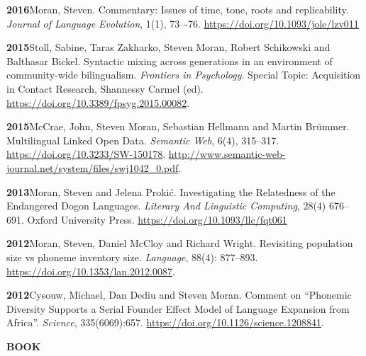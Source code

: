 \documentclass[11pt]{article}
\newcommand{\hangpara}{
 \setlength{\parindent}{0in} %
 \hangindent=0.42in %
}
\begin{document}
\hangpara
\vskip 6pt
{\bf 2016}\hspace{1ex}Moran, Steven. Commentary: Issues of time, tone, roots and replicability. \textit{Journal of Language Evolution}, 1(1), 73–-76. \url{https://doi.org/10.1093/jole/lzv011}

\vskip 6pt
\hangpara
{\bf 2015}\hspace{1ex}Stoll, Sabine, Taras Zakharko, Steven Moran, Robert Schikowski and Balthasar Bickel. Syntactic mixing across generations in an environment of community-wide bilingualism. \textit{Frontiers in Psychology}. Special Topic: Acquisition in Contact Research, Shannessy Carmel (ed). \url{https://doi.org/10.3389/fpsyg.2015.00082}. %

\hangpara
\vskip 6pt
{\bf 2015}\hspace{1ex}McCrae, John, Steven Moran, Sebastian Hellmann and Martin Brümmer. Multilingual Linked Open Data. \textit{Semantic Web}, 6(4), 315--317. \url{https://doi.org/10.3233/SW-150178}. \url{http://www.semantic-web-journal.net/system/files/swj1042\_0.pdf}.

\vskip 6pt
\hangpara
{\bf 2013}\hspace{1ex}Moran, Steven and Jelena Proki{\'c}. Investigating the Relatedness of the Endangered Dogon Languages. \textit{Literary And Linguistic Computing}, 28(4) 676--691. Oxford University Press. \url{https://doi.org/10.1093/llc/fqt061}

\vskip 6pt
\hangpara
{\bf 2012}\hspace{1ex}Moran, Steven, Daniel McCloy and Richard Wright. Revisiting population size vs phoneme inventory size. {\it Language}, 88(4): 877--893. \url{https://doi.org/10.1353/lan.2012.0087}. %

\vskip 6pt
\hangpara
{\bf 2012}\hspace{1ex}Cysouw, Michael, Dan Dediu and Steven Moran. Comment on ``Phonemic Diversity Supports a Serial Founder Effect Model of Language Expansion from Africa''. \textit{Science}, 335(6069):657. \url{https://doi.org/10.1126/science.1208841}.


\clearpage
\vskip 20pt
\begin{flushleft}
{\bf BOOK}
\end{flushleft}
\end{document}
